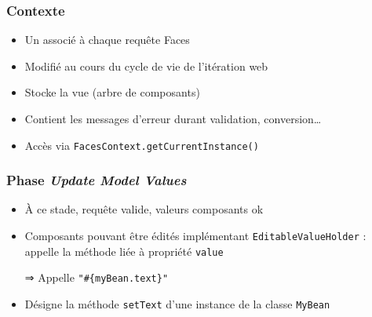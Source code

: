 \documentclass[english, french]{beamer}
\begin{document}
\begin{frame}
	\frametitle{Contexte}
	\begin{itemize}
		\item Un  associé à chaque requête Faces
		\item Modifié au cours du cycle de vie de l’itération web
		\item Stocke la vue (arbre de composants)
		\item Contient les messages d’erreur durant validation, conversion…
		\item Accès via \texttt{FacesContext.getCurrentInstance()}
	\end{itemize}
\end{frame}

\begin{frame}[label=ph-umv]
	\frametitle{Phase \emph{Update Model Values}}
	\begin{itemize}
		\item À ce stade, requête valide, valeurs composants ok
		\item Composants pouvant être édités {\tiny implémentant \texttt{EditableValueHolder}} : appelle la méthode liée à propriété \texttt{value}
		\item[⇒] Appelle \texttt{"\#\{myBean.text\}"}
		\item Désigne la méthode \texttt{setText} d’une instance de la classe \texttt{MyBean}
	\end{itemize}
\end{frame}
\end{document}
